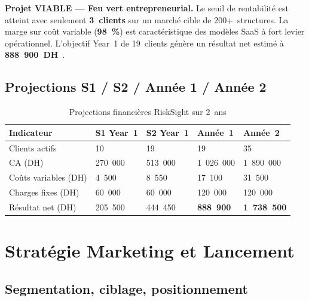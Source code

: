 \documentclass[12pt, a4paper]{report}
\begin{document}
\begin{tcolorbox}[successbox,title={Verdict de Faisabilité Financière}]
\textbf{Projet VIABLE --- Feu vert entrepreneurial.}
Le seuil de rentabilité est atteint avec seulement \textbf{3~clients} sur un
marché cible de 200+~structures. La marge sur coût variable (\textbf{98~\%})
est caractéristique des modèles SaaS à fort levier opérationnel.
L'objectif Year~1 de 19~clients génère un résultat net estimé à
\textbf{888~900~DH}~\cite{tp3_faisabilite}.
\end{tcolorbox}

\subsection{Projections S1 / S2 / Année 1 / Année 2}

\begin{table}[H]
\centering
\caption{Projections financières RiskSight sur 2~ans}
\label{tab:projections}
\renewcommand{\arraystretch}{1.3}
\begin{tabularx}{\textwidth}{X p{2.5cm} p{2.5cm} p{2.5cm} p{2.5cm}}
\toprule
\rowcolor{primary!12}
Indicateur & S1 Year~1 & S2 Year~1 & Année~1 & Année~2 \\
\midrule
Clients actifs & 10 & 19 & 19 & 35 \\
CA (DH) & 270~000 & 513~000 & 1~026~000 & 1~890~000 \\
Coûts variables (DH) & 4~500 & 8~550 & 17~100 & 31~500 \\
Charges fixes (DH) & 60~000 & 60~000 & 120~000 & 120~000 \\
Résultat net (DH) & 205~500 & 444~450 & \textbf{888~900} & \textbf{1~738~500} \\
\bottomrule
\end{tabularx}
\end{table}

\section{Stratégie Marketing et Lancement}

\subsection{Segmentation, ciblage, positionnement}
\end{document}
